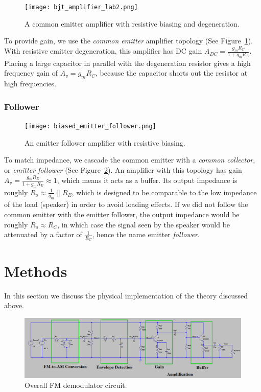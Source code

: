 \documentclass[11pt]{article}
\begin{document}
        \begin{figure}[H]
            \centering
                \texttt{[image: bjt\_amplifier\_lab2.png]}
            \caption{A common emitter amplifier with resistive biasing and degeneration.}
            \label{ce}
        \end{figure}
        
        \noindent To provide gain, we use the \emph{common emitter} amplifier topology (See Figure~\ref{ce}). With resistive emitter degeneration, this amplifier has DC gain $A_{DC} = \frac{g_m R_C}{1 + g_m R_E}$. Placing a large capacitor in parallel with the degeneration resistor gives a high frequency gain of $A_v = g_m R_C$, because the capacitor shorts out the resistor at high frequencies.

        \subsubsection{Follower}
        
        \begin{figure}[H]
            \centering
                \texttt{[image: biased\_emitter\_follower.png]}
            \caption{An emitter follower amplifier with resistive biasing.}
            \label{cc}
        \end{figure}
        
        To match impedance, we cascade the common emitter with a \emph{common collector}, or \emph{emitter follower} (See Figure~\ref{cc}). An amplifier with this topology has gain $A_v = \frac{g_m R_E}{1 + g_m R_E} \approx 1$, which means it acts as a buffer. Its output impedance is roughly $R_o \approx \frac{1}{g_m} \parallel R_E$, which is designed to be comparable to the low impedance of the load (speaker) in order to avoid loading effects. If we did not follow the common emitter with the emitter follower, the output impedance would be roughly $R_o \approx R_C$, in which case the signal seen by the speaker would be attenuated by a factor of $\frac{1}{R_C}$, hence the name emitter \emph{follower}.

\section{Methods}
In this section we discuss the physical implementation of the theory discussed above.

\begin{figure}[H]
    \centering
        \includegraphics[width = \textwidth]{block_diagram.png}
    \caption{Overall FM demodulator circuit.}
    \label{bd}
\end{figure}
\end{document}
